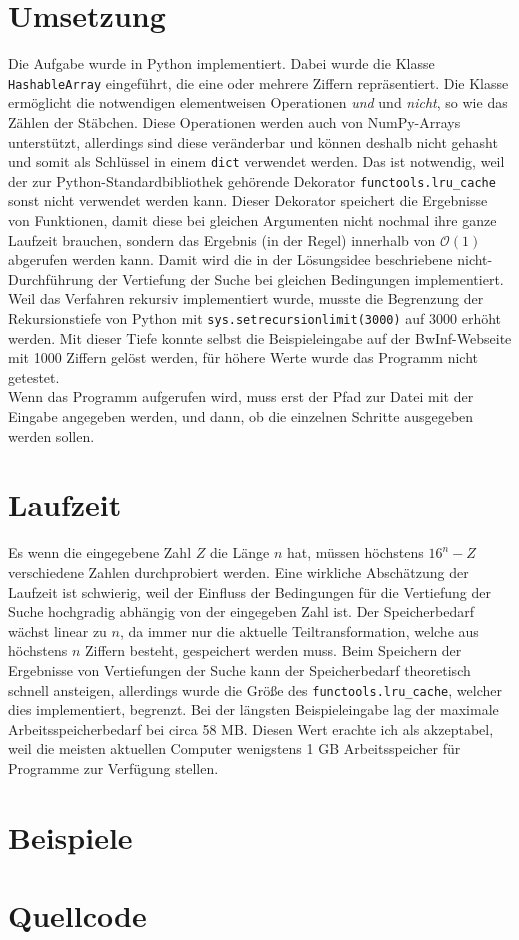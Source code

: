 \documentclass[a4paper,10pt,ngerman]{scrartcl}
\begin{document}
\section{Umsetzung}
Die Aufgabe wurde in Python implementiert. Dabei wurde die Klasse \lstinline|HashableArray| eingeführt, die eine oder mehrere Ziffern repräsentiert. Die Klasse ermöglicht die notwendigen elementweisen Operationen \textit{und} und \textit{nicht}, so wie das Zählen der Stäbchen. Diese Operationen werden auch von NumPy-Arrays unterstützt, allerdings sind diese veränderbar und können deshalb nicht gehasht und somit als Schlüssel in einem \lstinline|dict| verwendet werden. Das ist notwendig, weil der zur Python-Standardbibliothek gehörende Dekorator \lstinline|functools.lru_cache| sonst nicht verwendet werden kann. Dieser Dekorator speichert die Ergebnisse von Funktionen, damit diese bei gleichen Argumenten nicht nochmal ihre ganze Laufzeit brauchen, sondern das Ergebnis (in der Regel) innerhalb von $\mathcal{O}(1)$ abgerufen werden kann. Damit wird die in der Lösungsidee beschriebene nicht-Durchführung der Vertiefung der Suche bei gleichen Bedingungen implementiert. Weil das Verfahren rekursiv implementiert wurde, musste die Begrenzung der Rekursionstiefe von Python mit \lstinline|sys.setrecursionlimit(3000)| auf 3000 erhöht werden. Mit dieser Tiefe konnte selbst die Beispieleingabe auf der BwInf-Webseite mit 1000 Ziffern gelöst werden, für höhere Werte wurde das Programm nicht getestet. \\
Wenn das Programm aufgerufen wird, muss erst der Pfad zur Datei mit der Eingabe angegeben werden, und dann, ob die einzelnen Schritte ausgegeben werden sollen.
\section{Laufzeit}
Es wenn die eingegebene Zahl $Z$ die Länge $n$ hat, müssen höchstens $16^n-Z$ verschiedene Zahlen durchprobiert werden. Eine wirkliche Abschätzung der Laufzeit ist schwierig, weil der Einfluss der Bedingungen für die Vertiefung der Suche hochgradig abhängig von der eingegeben Zahl ist. Der Speicherbedarf wächst linear zu $n$, da immer nur die aktuelle Teiltransformation, welche aus höchstens $n$ Ziffern besteht, gespeichert werden muss. Beim Speichern der Ergebnisse von Vertiefungen der Suche kann der Speicherbedarf theoretisch schnell ansteigen, allerdings wurde die Größe des \lstinline|functools.lru_cache|, welcher dies implementiert, begrenzt. Bei der längsten Beispieleingabe lag der maximale Arbeitsspeicherbedarf bei circa 58 MB. Diesen Wert erachte ich als akzeptabel, weil die meisten aktuellen Computer wenigstens 1 GB Arbeitsspeicher für Programme zur Verfügung stellen.
\section{Beispiele}

\section{Quellcode}

\end{document}
